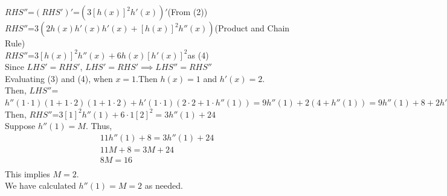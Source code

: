 \documentclass[12pt]{exam}
\newcommand {\DS} [1] {${\displaystyle #1}$}
\begin{document}
\begin{enumerate}[resume]
	\DS{RHS''}=\DS{(RHS')'}=$(3[h(x)]^2h'(x))'$\qquad(From (2))\\
	\DS{RHS''}=$3(2h(x)h'(x)h'(x)+[h(x)]^2h''(x))$\qquad(Product and Chain Rule)\\
	\DS{RHS''}=$3[h(x)]^2h''(x)+6h(x)[h'(x)]^2$\qquad as (4)\\
	Since $LHS'=RHS'$, $LHS'=RHS' \implies LHS''=RHS''$\\
	Evaluating (3) and (4), when $x=1$.Then $h(x)=1$ and $h'(x)=2$. \\
	Then, \DS{LHS''}=$h''(1\cdot1)(1+1\cdot2)(1+1\cdot2)+h'(1\cdot1)(2\cdot2+1\cdot h''(1))=9h''(1)+2(4+h''(1))=9h''(1)+8+2h''(1)=11h''(1)+8$\\
	Then, \DS{RHS''}=$3[1]^2h''(1)+6\cdot1[2]^2=3h''(1)+24$\\
	Suppose $h''(1)=M.$
	Thus,
	\begin{align*}
	    11h''(1)+8=3h''(1)+24\\
	    11M+8=3M+24\\
	    8M=16\\
	\end{align*}
	This implies $M=2.$\\
	We have calculated $h''(1)=M=2$ as needed.


\end{enumerate}
\end{document}
